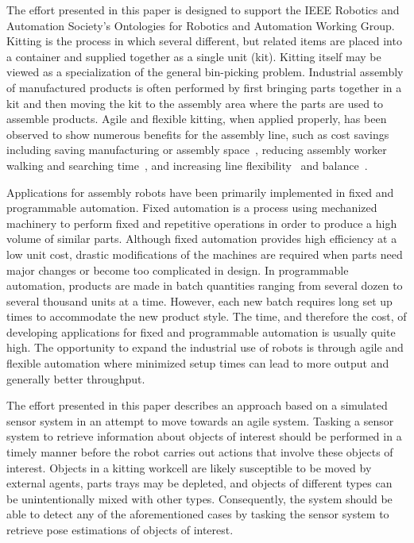 The effort presented in this paper is designed to support the IEEE Robotics and Automation Society's Ontologies for Robotics and Automation Working Group.
Kitting is the process in which several different, but related items are placed into a container and supplied together as a single unit (kit).
Kitting itself may be viewed as a specialization of the general bin-picking problem. Industrial assembly of manufactured products is often performed by first
bringing parts together in a kit and then moving the kit to the assembly area where the parts are used to assemble products. Agile and flexible kitting, when
applied properly, has been observed to show numerous benefits for the assembly line, such as cost savings~\cite{Carlsson_2008} including saving manufacturing or
assembly space~\cite{Medbo2003}, reducing assembly worker walking and searching time~\cite{Schwind1992}, and increasing line flexibility~\cite{Bozer1992} and
balance~\cite{Jiao2000}.

Applications for assembly robots have been primarily implemented in fixed and programmable automation. Fixed automation is a process using mechanized machinery
to perform fixed and repetitive operations in order to produce a high volume of similar parts. Although fixed automation provides high efficiency at a low unit
cost, drastic modifications of the machines are required when parts need major changes or become too complicated in design. In programmable automation, products
are made in batch quantities ranging from several dozen to several thousand units at a time. However, each new batch requires long set up times to accommodate the
new product style. The time, and therefore the cost, of developing applications for fixed and programmable automation is usually quite high. The opportunity to expand
the industrial use of robots is through agile and flexible automation where minimized setup times can lead to more output and generally better throughput.

The effort presented in this paper describes an approach based on a simulated sensor system in an attempt to move towards an agile system. Tasking a sensor system
to retrieve information about objects of interest should be performed in a timely manner before the robot carries out actions that involve these objects of interest.
Objects in a kitting workcell are likely susceptible to be moved by external agents, parts trays may be depleted, and objects of different types can be
unintentionally mixed with other types. Consequently, the system should be able to detect any of the aforementioned cases by tasking the sensor system to
retrieve pose estimations of objects of interest.

